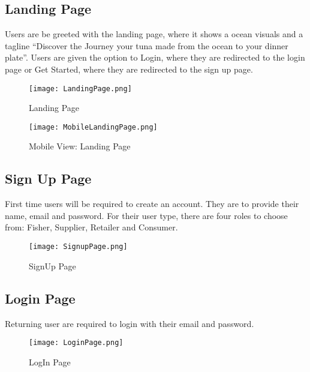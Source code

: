 \subsection{Landing Page}
Users are be greeted with the landing page, where it shows a ocean visuals and a tagline “Discover the Journey your tuna made from the ocean to your dinner plate”. Users are given the option to Login, where they are redirected to the login page or Get Started, where they are redirected to the sign up page. 

	\begin{figure}[H]
		\centering
		\texttt{[image: LandingPage.png]}
		\caption{Landing Page}
		\label{fig:landing_page}
	\end{figure}
	
	\begin{figure}[H]
		\centering
		\texttt{[image: MobileLandingPage.png]}
		\caption{Mobile View: Landing Page}
		\label{fig:mobile_landing_page}
	\end{figure}	

\subsection{Sign Up Page}
First time users will be required to create an account. They are to provide their name, email and password. For their user type, there are four roles to choose from: Fisher, Supplier, Retailer and Consumer. 

	\begin{figure}[H]
		\centering
		\texttt{[image: SignupPage.png]}
		\caption{SignUp Page}
		\label{fig:signup_page}
	\end{figure}

\subsection{Login Page}
Returning user are required to login with their email and password.

	\begin{figure}[H]
		\centering
		\texttt{[image: LoginPage.png]}
		\caption{LogIn Page}
		\label{fig:login_page}
	\end{figure}

